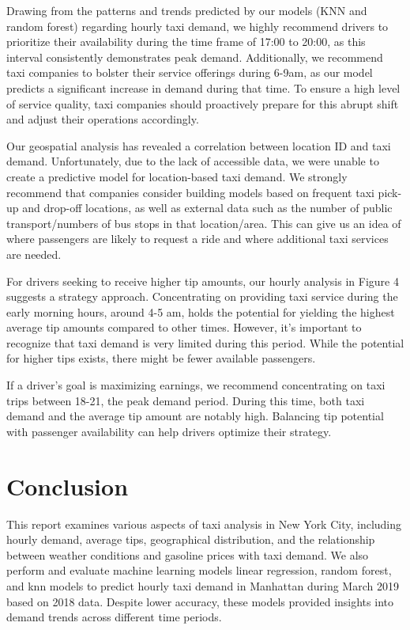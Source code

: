 \documentclass[11pt]{article}
\begin{document}
Drawing from the patterns and trends predicted by our models (KNN and random forest) regarding hourly taxi demand, we highly recommend drivers to prioritize their availability during the time frame of 17:00 to 20:00, as this interval consistently demonstrates peak demand. Additionally, we recommend taxi companies to bolster their service offerings  during 6-9am, as our model predicts a significant increase in demand during that time. To ensure a high level of service quality, taxi companies should proactively prepare for this abrupt shift and adjust their operations accordingly.

Our geospatial analysis has revealed a correlation between location ID and taxi demand. Unfortunately, due to the lack of accessible data, we were unable to create a predictive model for location-based taxi demand. We strongly recommend that companies consider building models based on frequent taxi pick-up and drop-off locations, as well as external data such as the number of public transport/numbers of bus stops in that location/area. This can give us an idea of where passengers are likely to request a ride and where additional taxi services are needed.


For drivers seeking to receive higher tip amounts, our hourly analysis in Figure 4 suggests a strategy approach.  Concentrating on providing taxi service during the early morning hours, around 4-5 am, holds the potential for yielding the highest average tip amounts compared to other times. However, it's important to recognize that taxi demand is very limited during this period. While the potential for higher tips exists, there might be fewer available passengers.


If a driver's goal is maximizing earnings, we recommend concentrating on taxi trips between 18-21, the peak demand period. During this time, both taxi demand and the average tip amount are notably high. Balancing tip potential with passenger availability can help drivers optimize their strategy.


\section{Conclusion}
This report examines various aspects of taxi analysis in New York City, including hourly demand, average tips, geographical distribution, and the relationship between weather conditions and gasoline prices with taxi demand. We also perform and evaluate machine learning models linear regression, random forest, and knn models to predict hourly taxi demand in Manhattan during March 2019 based on 2018 data. Despite lower accuracy, these models provided insights into demand trends across different time periods.
\end{document}
